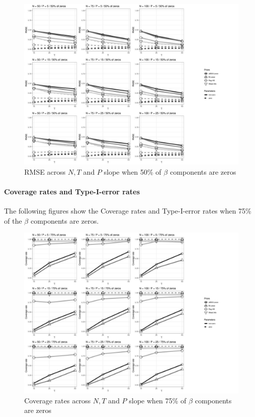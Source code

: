 \documentclass[a4paper,12pt]{article}
\begin{document}
\begin{figure}[]\label{fig:MSE_nz50}
\centering 
\includegraphics[width=18cm]{MSE_nz50_beta.jpg}
\caption{RMSE across $N, T$ and $P$ slope when 50\% of $\beta$ components are zeros}
\end{figure}

\clearpage
\paragraph{Coverage rates and Type-I-error rates}
The following figures show the Coverage rates and Type-I-error rates when 75\% of the $\beta$ components are zeros. 

\begin{figure}[h]\label{fig:CIR_nz25}
\centering 
\includegraphics[width=18cm]{CIR_nz25_beta.jpg}
\caption{Coverage rates across $N, T$ and $P$ slope when 75\% of $\beta$ components are zeros}
\end{figure}
\end{document}
